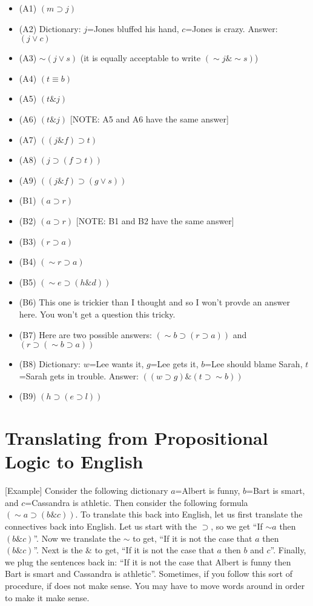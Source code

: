 \documentclass[
]{book}
\providecommand{\tightlist}{%
  \setlength{\itemsep}{0pt}\setlength{\parskip}{0pt}}
\begin{document}
\begin{itemize}
\tightlist
\item
  (A1) \((m \supset j)\)
\item
  (A2) Dictionary: \(j\)=Jones bluffed his hand, \(c\)=Jones is crazy. Answer: \((j \lor c)\)
\item
  (A3) \(\sim(j \lor s)\) (it is equally acceptable to write \((\sim j \& \sim s)\))
\item
  (A4) \((t \equiv b)\)
\item
  (A5) \((t \& j)\)
\item
  (A6) \((t \& j)\) {[}NOTE: A5 and A6 have the same answer{]}
\item
  (A7) \(((j \& f) \supset t)\)
\item
  (A8) \((j \supset (f \supset t))\)
\item
  (A9) \(((j \& f) \supset (g \lor s))\)
\item
  (B1) \((a \supset r)\)
\item
  (B2) \((a \supset r)\) {[}NOTE: B1 and B2 have the same answer{]}
\item
  (B3) \((r \supset a)\)
\item
  (B4) \((\sim r\supset a)\)
\item
  (B5) \((\sim e \supset (h \& d))\)
\item
  (B6) This one is trickier than I thought and so I won't provde an answer here. You won't get a question this tricky.
\item
  (B7) Here are two possible answers: \((\sim b \supset (r \supset a))\) and \((r \supset (\sim b \supset a))\)
\item
  (B8) Dictionary: \(w\)=Lee wants it, \(g\)=Lee gets it, \(b\)=Lee should blame Sarah, \(t\)=Sarah gets in trouble. Answer: \(((w \supset g) \& (t \supset \sim b))\)
\item
  (B9) \((h \supset (e \supset l))\)
\end{itemize}

\hypertarget{translating-from-propositional-logic-to-english}{%
\section{Translating from Propositional Logic to English}\label{translating-from-propositional-logic-to-english}}

{[}Example{]} Consider the following dictionary \(a\)=Albert is funny, \(b\)=Bart is smart, and \(c\)=Cassandra is athletic. Then consider the following formula \((\sim a \supset (b \& c))\). To translate this back into English, let us first translate the connectives back into English. Let us start with the \(\supset\), so we get ``If \(\sim a\) then \((b \& c)\)''. Now we translate the \(\sim\) to get, ``If it is not the case that \(a\) then \((b \& c)\)''. Next is the \(\&\) to get, ``If it is not the case that \(a\) then \(b\) and \(c\)''. Finally, we plug the sentences back in: ``If it is not the case that Albert is funny then Bart is smart and Cassandra is athletic''. Sometimes, if you follow this sort of procedure, if does not make sense. You may have to move words around in order to make it make sense.

  
\end{document}
